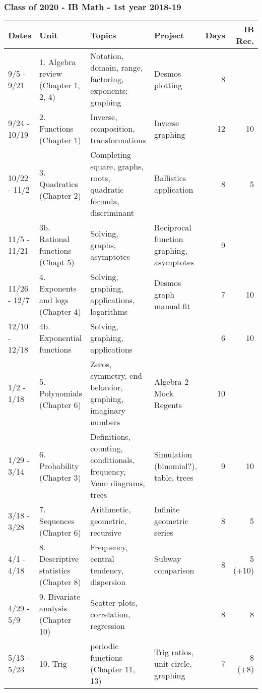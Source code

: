 \documentclass[12pt, twoside]{article}
\begin{document}
\subsubsection*{Class of 2020 - IB Math - 1st year 2018-19}

\begin{tabular}{|p{2.4cm}|p{4.7cm}|p{8cm}|p{4cm}|r|r|}
  \hline
  Dates & Unit & Topics  & Project & Days & IB Rec.\\
  \hline
  9/5 - 9/21 & 1. Algebra review (Chapter 1, 2, 4) & Notation, domain, range, factoring, exponents; graphing & Desmos plotting & 8 & \\
  \hline
  9/24 - 10/19 & 2. Functions (Chapter 1) & Inverse, composition, transformations &Inverse graphing&12& 10 \\
  \hline
  10/22 - 11/2 & 3. Quadratics (Chapter 2) & Completing square, graphs, roots, quadratic formula, discriminant&Ballistics application&8& 5 \\
  \hline
  11/5 - 11/21 & 3b. Rational functions (Chapt 5)  & Solving, graphs, asymptotes &Reciprocal function graphing, asymptotes &9& \\
  \hline
  11/26 - 12/7 & 4. Exponents and logs  (Chapter 4) & Solving, graphing, applications, logarithms &Desmos graph manual fit &7& 10 \\
  \hline
  12/10 - 12/18 & 4b. Exponential functions & Solving, graphing, applications & &6& 10 \\
  \hline
  1/2 - 1/18 & 5. Polynomials (Chapter 6) & Zeros, symmetry, end behavior, graphing, imaginary numbers &Algebra 2 Mock Regents & 10 & \\
  \hline
  1/29 - 3/14 & 6. Probability  (Chapter 3) & Definitions, counting, conditionals, frequency, Venn diagrams, trees&Simulation (binomial?), table, trees & 9 & 10 \\
  \hline
  3/18 - 3/28 & 7. Sequences (Chapter 6) & Arithmetic, geometric, recursive &Infinite geometric series & 8 & 5 \\
  \hline
  4/1 - 4/18 & 8. Descriptive statistics  (Chapter 8) & Frequency, central tendency, dispersion & Subway comparison & 8 & 5 (+10) \\
  \hline
  4/29 - 5/9 & 9. Bivariate analysis (Chapter 10)  & Scatter plots, correlation, regression & & 8 & 8 \\
  \hline
  5/13 - 5/23 & 10. Trig & periodic functions (Chapter 11, 13) & Trig ratios, unit circle, graphing & 7& 8 (+8) \\
  \hline
\end{tabular}
\end{document}
